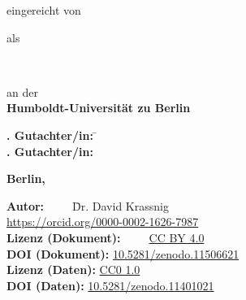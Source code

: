 \makeatletter
\begin{titlepage}
\doublespacing\centering%
\textbf{\Huge\sffamily \@title}\vskip 2.5mm

\textbf{\Large\sffamily \@subtitle}\vfill

{\large eingereicht von}\\
\resizebox{%
      \ifdim\width>\textwidth
        \textwidth
      \else
        \width
      \fi
    }{!}{%
    \textbf{\Large\sffamily \@author}}\vfill

{\large als}\\
    \textbf{\Large\sffamily\degreevar}\vfill

{\large\degreecontextvar}\\
\resizebox{%
      \ifdim\width>\textwidth
        \textwidth
      \else
        \width
      \fi
    }{!}{%
    \textbf{\Large\sffamily\programmevar}}\vfill

{\large an der}\\
\textbf{\Large\sffamily Humboldt-Universität zu Berlin}\vfill

\resizebox{%
      \ifdim\width>\textwidth
        \textwidth
      \else
        \width
      \fi
    }{!}{%
    \textbf{\Large\sffamily\facultyvar}}

\resizebox{%
      \ifdim\width>\textwidth
        \textwidth
      \else
        \width
      \fi
    }{!}{%
    \textbf{\Large\sffamily\institutevar}}\vfill

\parbox{0cm}{\large%
    \begin{tabbing}
        \textbf{. Gutachter/in:} \= \firstsupervisorvar\\
        \textbf{. Gutachter/in:} \> \secondsupervisorvar
    \end{tabbing}
}\vfill


\textbf{\large\sffamily Berlin, \@date}
\end{titlepage}
\makeatother
\thispagestyle{empty}
\hbox{}\vfill\enlargethispage{15mm}
\begin{tabbing}
\noindent\textbf{Autor:}~~~~~\=Dr. David Krassnig\\
\> \url{https://orcid.org/0000-0002-1626-7987}\\[\baselineskip]
\textbf{Lizenz (Dokument):}~~~~~\= \href{https://creativecommons.org/licenses/by/4.0/deed.de}{CC BY 4.0}\\
\textbf{DOI (Dokument):}\> \href{https://www.doi.org/10.5281/zenodo.11506621}{10.5281/zenodo.11506621}\\[.5\baselineskip]
\textbf{Lizenz (Daten):}\> \href{https://creativecommons.org/publicdomain/zero/1.0/deed.de}{CC0 1.0}\\
\textbf{DOI (Daten):}\> \href{https://www.doi.org/10.5281/zenodo.11401021}{10.5281/zenodo.11401021}
\end{tabbing}\newpage
